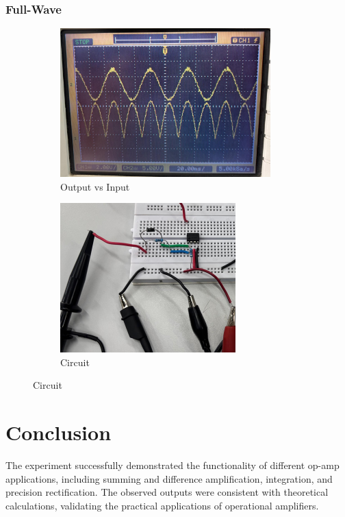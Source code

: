 \documentclass[a4paper,12pt]{article}
\begin{document}
\subsubsection*{Full-Wave}
\begin{figure}[!h]
	\begin{subfigure}[b]{100pt}
		\caption{Output vs Input}
		\includegraphics[width = 230pt]{figs/full1.png}
	\end{subfigure}
	\hspace{110pt}
	\begin{subfigure}[b]{100pt}
		\caption{Circuit}
		\includegraphics[width = 192pt]{figs/full2.png}
	\end{subfigure}
\end{figure}

\section*{Conclusion}
The experiment successfully demonstrated the functionality of different op-amp applications, including summing and difference amplification, integration, and precision rectification. The observed outputs were consistent with theoretical calculations, validating the practical applications of operational amplifiers.
\end{document}
